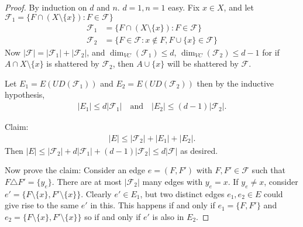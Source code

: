 \documentclass{article}
\begin{document}
\begin{proof}
  \newlec
  By induction on $d$ and $n$. $d=1,n=1$ easy.
  Fix $x \in X$, and let $\mathcal{F}_1 = \{F \cap (X \setminus \{x\}) : F \in \mathcal{F}\}$
  \begin{align*}
    \mathcal{F}_1 &= \{F \cap (X \setminus \{x\}) : F \in \mathcal{F}\} \\
    \mathcal{F}_2 &= \{F \in \mathcal{F} : x \notin F, F \cup \{x\} \in \mathcal{F}\}
  \end{align*}
  Now $|\mathcal{F}| = |\mathcal{F}_1| + |\mathcal{F}_2|$, and $\dim_{VC}(\mathcal{F}_1) \leq d$, $\dim_{VC}(\mathcal{F}_2) \leq d-1$ for if $A \cap X \setminus \{x\}$ is shattered by $\mathcal{F}_2$, then $A \cup \{x\}$ will be shattered by $\mathcal{F}$.

  Let $E_1 = E(UD(\mathcal{F}_1))$ and $E_2 = E(UD(\mathcal{F}_2))$ then by the inductive hypothesis,
  \begin{align*}
    |E_1| \leq d|\mathcal{F}_1| \quad \text{and} \quad |E_2| \leq (d-1)|\mathcal{F}_2|.
  \end{align*}

  Claim:
  \begin{align*}
  |E| \leq |\mathcal{F}_2| + |E_1| + |E_2|.
  \end{align*}
  Then $|E| \leq |\mathcal{F}_2| + d |\mathcal{F}_1| + (d-1)|\mathcal{F}_2| \leq d|\mathcal{F}|$ as desired.

  Now prove the claim: Consider an edge $e = (F,F')$ with $F,F' \in \mathcal{F}$ such that $F \triangle F' = \{y_e\}$.
  There are at most $|\mathcal{F}_2|$ many edges with $y_e = x$.
  If $y_e \neq x$, consider $e' = \{F \setminus \{x\}, F' \setminus \{x\}\}$.
  Clearly $e' \in E_1$, but two distinct edges $e_1,e_2 \in E$ could give rise to the same $e'$ in this. This happens if and only if $e_1 = \{F,F'\}$ and $e_2 = \{F \setminus \{x\}, F' \setminus \{x\}\}$ so if and only if $e'$ is also in $E_2$.
\end{proof}
\end{document}
